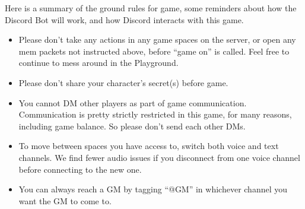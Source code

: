 \documentclass[green]{TMFHope}
\begin{document}
Here is a summary of the ground rules for game, some reminders about how the Discord Bot will work, and how Discord interacts with this game.
\begin{itemize}
	\item Please don't take any actions in any game spaces on the server, or open any mem packets not instructed above, before ``game on'' is called. Feel free to continue to mess around in the Playground.
	\item Please don't share your character's secret(s) before game.
	\item You cannot DM other players as part of game communication. Communication is pretty strictly restricted in this game, for many reasons, including game balance. So please don't send each other DMs.
	\item To move between spaces you have access to, switch both voice and text channels. We find fewer audio issues if you disconnect from one voice channel before connecting to the new one.
	\item You can always reach a GM by tagging ``@GM'' in whichever channel you want the GM to come to.
\end{itemize}
\end{document}
